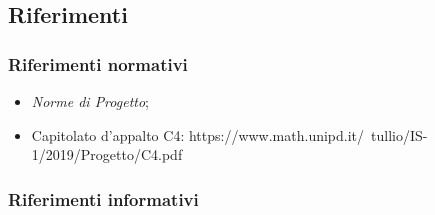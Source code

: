 \subsection{Riferimenti}
\subsubsection{Riferimenti normativi}
\begin{itemize}
	\item \textit{Norme di Progetto};
	\item Capitolato d'appalto C4: https://www.math.unipd.it/~tullio/IS-1/2019/Progetto/C4.pdf
\end{itemize}
\subsubsection{Riferimenti informativi}